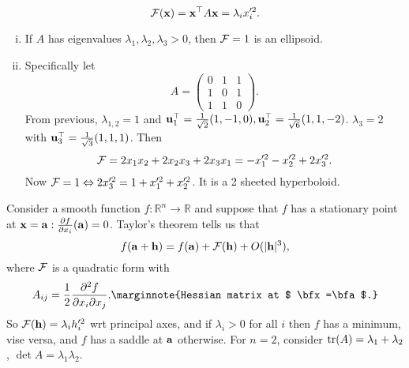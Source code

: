 \documentclass[10pt]{article}
\begin{document}
    \begin{example}[$\mathbb{R}^3$]
        \[
            {\mathcal{F}}({\bf x})={\bf x}^{\top}A{\bf x} = \lambda_i x_i'^2.
        \]
        \begin{enumerate}[(i)]
            \item If $A$ has eigenvalues $\lambda_1,\lambda_2,\lambda_3>0$, then $ {\mathcal{F}}=1 $ is an ellipsoid.
            \item Specifically let 
            \[
                A= \begin{pmatrix}
                    0&1&1\\
                    1&0&1\\
                    1&1&0
                \end{pmatrix}.
            \]
            From previous, $ \lambda_{1,2}=1 $ and $ {\bf u}_1^{\top}=\frac{1}{\sqrt{2}}(1,-1,0), {\bf u}_2^{\top}=\frac{1}{\sqrt{6}}(1,1,-2) $. $ \lambda_3=2 $ with $ {\bf u}_3^{\top}=\frac{1}{\sqrt{3}}(1,1,1) $. Then 
            \[
                {\mathcal{F}} = 2x_1x_2+2x_2x_3+2x_3x_1 = -x_1'^2-x_2'^2+2x_3'^2.
            \]
            Now ${\mathcal{F}}=1 \Leftrightarrow 2x_3'^2=1+x_1'^2+x_2'^2 $. It is a 2 sheeted hyperboloid.
        \end{enumerate}
    \end{example}
    \begin{example}
        Consider a smooth function $ f: \mathbb{R}^{n}\to \mathbb{R} $ and suppose that $f$ has a stationary point at $ {\bf x}={\bf a}: \frac{\partial f}{\partial x_i}({\bf a})=0  $. Taylor's theorem tells us that 
        \[
            f({\bf a}+{\bf h})=f({\bf a})+{\mathcal{F}}({\bf h})+O(|{\bf h}|^3),
        \]
        where ${\mathcal{F}}$ is a quadratic form with
        \[
            A_{ij}=\frac{1}{2} \frac{\partial^2f}{\partial x_i \partial x_j}.\marginnote{Hessian matrix at $ \bfx=\bfa $.} 
        \]
        So $ {\mathcal{F}}({\bf h})=\lambda_i h_i'^2 $ wrt principal axes, and if $ \lambda_i>0 $ for all $i$ then $f$ has a minimum, vise versa, and $f$ has a saddle at ${\bf a}$ otherwise. For $n=2$, consider $ \tr(A)=\lambda_1+\lambda_2 $, $ \det A=\lambda_1\lambda_2 $.
    \end{example}
\end{document}
